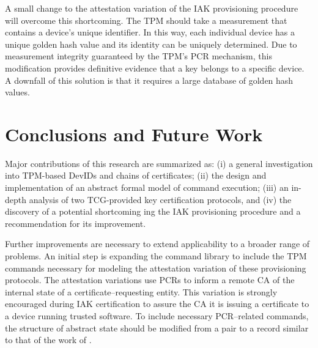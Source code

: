 \documentclass[runningheads]{llncs}
\begin{document}
A small change to the attestation variation of the IAK provisioning
procedure will overcome this shortcoming. The TPM should take a
measurement that contains a device's unique identifier. In this way,
each individual device has a unique golden hash value and its identity
can be uniquely determined.  Due to measurement integrity guaranteed
by the TPM's PCR mechanism, this modification provides definitive
evidence that a key belongs to a specific device. A downfall of this
solution is that it requires a large database of golden hash
values. %
%
%
%
\section{Conclusions and Future Work}

Major contributions of this research are summarized as: (i) a
general investigation into TPM-based DevIDs and chains of
certificates; (ii) the design and implementation of an abstract formal
model of command execution; (iii) an in-depth analysis of two
TCG-provided key certification protocols, and (iv) the discovery of a
potential shortcoming ing the IAK provisioning procedure and a
recommendation for its improvement.

Further improvements are necessary to extend applicability to a
broader range of problems. An initial step is expanding the command
library to include the TPM commands necessary for modeling the
attestation variation of these provisioning protocols. The
attestation variations use PCRs to inform a remote CA of the internal
state of a certificate--requesting entity. This variation is strongly
encouraged during IAK certification to assure the CA it is issuing a
certificate to a device running trusted software.  To include
necessary PCR--related commands, the structure of abstract state
should be modified from a pair to a record similar to that of the work
of \citet{PrivacyCAAnalysis-Hall}.

% 
% 
%
%
%

%

%
\end{document}
